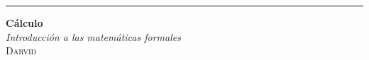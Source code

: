 \begin{titlepage}
	
  \raggedleft

  \rule{1pt}{.9\textheight}
\hspace{0.075\textwidth}
\parbox[b]{.85\textwidth}{{\Huge\bfseries Cálculo}\\[2\baselineskip]{\Large\textit{Introducción a las matemáticas formales}}\\[47.5\baselineskip]
      {\Large\textsc{Darvid}}\\[1\baselineskip]}
\end{titlepage}